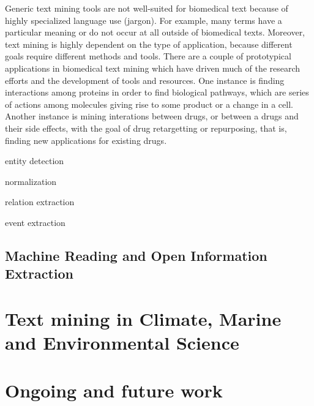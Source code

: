 \documentclass[11pt,oneside,a4paper]{report}
\begin{document}
Generic text mining tools are not well-suited for biomedical text because of highly specialized language use (jargon). 
For example, many terms have a particular meaning or do not occur at all outside of biomedical texts.
Moreover, text mining is highly dependent on the type of application, because different goals require different methods and tools.
There are a couple of prototypical applications in biomedical text mining which have driven much of the research efforts and the development of tools and resources.
One instance is finding interactions among proteins in order to find biological pathways, which are series of actions among molecules giving rise to some product or a change in a cell.
Another instance is mining interations between drugs, or between a drugs and their side effects, with the goal of drug retargetting or repurposing, that is, finding new applications for existing drugs.

entity detection

normalization

relation extraction

event extraction


\section{Machine Reading and Open Information Extraction}


\citet{Etzioni2011Search}




\chapter{Text mining in Climate, Marine and Environmental Science}


\chapter{Ongoing and future work} 




\end{document}

